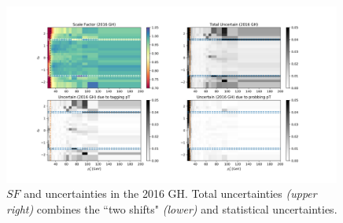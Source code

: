 \begin{figure}
    \centering
    \includegraphics[width=0.99\textwidth]{chapters/Analysis/sectionCalibration/figures/eTrigger/result_GH.png}
    \caption{$SF$ and uncertainties in the 2016 GH. Total uncertainties \emph{(upper right)} combines the ``two shifts" \emph{(lower)} and statistical uncertainties.}
    \label{fig:analysis:calibration:eTrSF_err_GH}
\end{figure}


